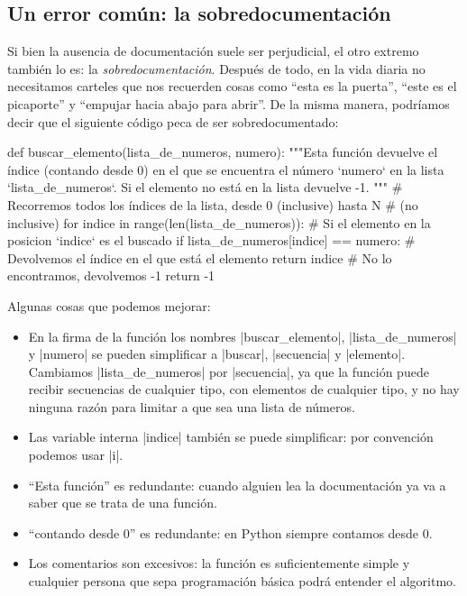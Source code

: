 \subsection{Un error común: la sobredocumentación}

Si bien la ausencia de documentación suele ser perjudicial, el otro extremo
también lo es: la \emph{sobredocumentación}. Después de todo, en la vida
diaria no necesitamos carteles que nos recuerden cosas como ``esta es la
puerta'', ``este es el picaporte'' y ``empujar hacia abajo para abrir''. De
la misma manera, podríamos decir que el siguiente código peca de ser sobredocumentado:

\begin{codigo-python-sn}
def buscar_elemento(lista_de_numeros, numero):
    """Esta función devuelve el índice (contando desde 0) en el que se
       encuentra el número `numero` en la lista `lista_de_numeros`.
       Si el elemento no está en la lista devuelve -1.
    """
    # Recorremos todos los índices de la lista, desde 0 (inclusive) hasta N
    # (no inclusive)
    for indice in range(len(lista_de_numeros)):
        # Si el elemento en la posicion `indice` es el buscado
        if lista_de_numeros[indice] == numero:
            # Devolvemos el índice en el que está el elemento
            return indice
    # No lo encontramos, devolvemos -1
    return -1
\end{codigo-python-sn}

Algunas cosas que podemos mejorar:

\begin{itemize}
\item En la firma de la función los nombres |buscar_elemento|,
    |lista_de_numeros| y |numero| se pueden simplificar a |buscar|, |secuencia| y
    |elemento|. Cambiamos |lista_de_numeros| por |secuencia|, ya que la función
    puede recibir secuencias de cualquier tipo, con elementos de cualquier
    tipo, y no hay ninguna razón para limitar a que sea una lista de números.
\item Las variable interna |indice| también se puede simplificar:
    por convención podemos usar |i|.
\item ``Esta función'' es redundante: cuando alguien lea la documentación ya va
    a saber que se trata de una función.
\item ``contando desde 0'' es redundante: en Python siempre contamos desde 0.
\item Los comentarios son excesivos: la función es suficientemente simple y
    cualquier persona que sepa programación básica podrá entender el algoritmo.
\end{itemize}

